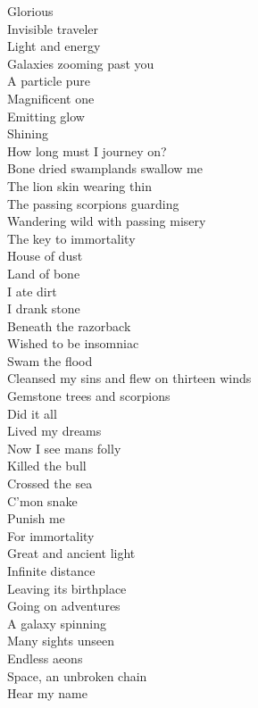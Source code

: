 Glorious  \\
Invisible traveler \\
Light and energy \\
Galaxies zooming past you \\
A particle pure \\
Magnificent one \\
Emitting glow \\
Shining \\
How long must I journey on? \\

Bone dried swamplands swallow me \\
The lion skin wearing thin \\
The passing scorpions guarding \\
Wandering wild with passing misery \\
The key to immortality \\

House of dust \\
Land of bone \\
I ate dirt \\
I drank stone \\
Beneath the razorback \\
Wished to be insomniac \\
Swam the flood \\
Cleansed my sins and flew on thirteen winds \\
Gemstone trees and scorpions \\
Did it all \\
Lived my dreams \\
Now I see mans folly \\
Killed the bull \\
Crossed the sea \\
C'mon snake \\
Punish me \\
For immortality \\

Great and ancient light \\
Infinite distance \\
Leaving its birthplace \\
Going on adventures \\
A galaxy spinning \\
Many sights unseen \\
Endless aeons \\
Space, an unbroken chain \\
Hear my name \\

